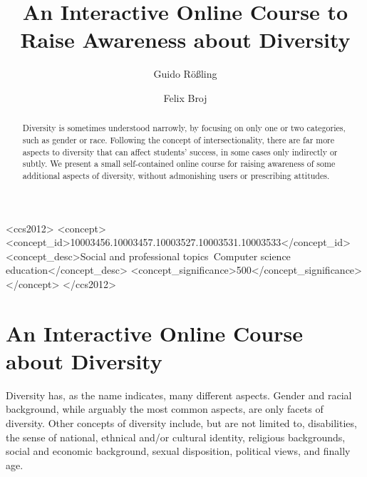 \documentclass[sigconf,screen]{acmart}
\begin{document}

\title{An Interactive Online Course to Raise Awareness about Diversity}

\author{Guido R\"o\ss{}ling}
\author{Felix Broj}
\begin{CCSXML}
<ccs2012>
<concept>
<concept_id>10003456.10003457.10003527.10003531.10003533</concept_id>
<concept_desc>Social and professional topics~Computer science education</concept_desc>
<concept_significance>500</concept_significance>
</concept>
</ccs2012>
\end{CCSXML}


\begin{abstract}
Diversity is sometimes understood narrowly, by focusing on only one or two categories,
such as gender or race. Following the concept of intersectionality, there are far more
aspects to diversity that can affect students' success, in some cases only indirectly or
subtly. We present a small self-contained online course for raising awareness of
some additional aspects of diversity, without admonishing users or prescribing attitudes.
\end{abstract}

\maketitle

\section{An Interactive Online Course about Diversity}

Diversity has, as the name indicates, many different aspects. Gender and racial
background, while arguably the most common aspects, are only facets of diversity. Other
concepts of diversity include, but are not limited to, disabilities, the sense of
national, ethnical and/or cultural identity, religious backgrounds, social and economic
background, sexual disposition, political views, and finally age.
\end{document}

